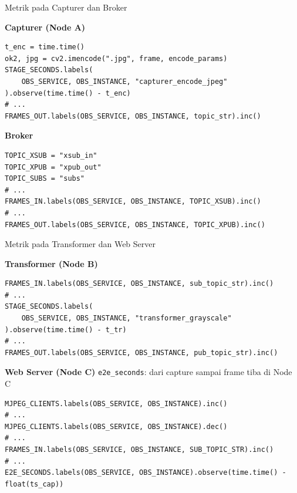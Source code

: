\documentclass[aspectratio=169, table]{beamer}
\begin{document}
\begin{frame}[fragile]{Metrik pada Capturer dan Broker}
	\vspace{20pt}
	
	\textbf{Capturer (Node A)}
	\begin{lstlisting}[style=PythonStyle,basicstyle=\ttfamily\scriptsize]
t_enc = time.time()
ok2, jpg = cv2.imencode(".jpg", frame, encode_params)
STAGE_SECONDS.labels(
    OBS_SERVICE, OBS_INSTANCE, "capturer_encode_jpeg"
).observe(time.time() - t_enc)
# ...
FRAMES_OUT.labels(OBS_SERVICE, OBS_INSTANCE, topic_str).inc()
\end{lstlisting}

	\textbf{Broker}
	\begin{lstlisting}[style=PythonStyle,basicstyle=\ttfamily\scriptsize]
TOPIC_XSUB = "xsub_in"
TOPIC_XPUB = "xpub_out"
TOPIC_SUBS = "subs"
# ...
FRAMES_IN.labels(OBS_SERVICE, OBS_INSTANCE, TOPIC_XSUB).inc()
# ...
FRAMES_OUT.labels(OBS_SERVICE, OBS_INSTANCE, TOPIC_XPUB).inc()
\end{lstlisting}
\end{frame}


\begin{frame}[fragile]{Metrik pada Transformer dan Web Server}
	\vspace{20pt}
	
	\textbf{Transformer (Node B)}
	\begin{lstlisting}[style=PythonStyle,basicstyle=\ttfamily\scriptsize]
FRAMES_IN.labels(OBS_SERVICE, OBS_INSTANCE, sub_topic_str).inc()
# ...
STAGE_SECONDS.labels(
    OBS_SERVICE, OBS_INSTANCE, "transformer_grayscale"
).observe(time.time() - t_tr)
# ...
FRAMES_OUT.labels(OBS_SERVICE, OBS_INSTANCE, pub_topic_str).inc()
\end{lstlisting}

	\textbf{Web Server (Node C)} {\footnotesize\texttt{e2e\_seconds}: dari capture sampai frame tiba di Node C}
	\begin{lstlisting}[style=PythonStyle,basicstyle=\ttfamily\scriptsize]
MJPEG_CLIENTS.labels(OBS_SERVICE, OBS_INSTANCE).inc()
# ...
MJPEG_CLIENTS.labels(OBS_SERVICE, OBS_INSTANCE).dec()
# ...
FRAMES_IN.labels(OBS_SERVICE, OBS_INSTANCE, SUB_TOPIC_STR).inc()
# ...
E2E_SECONDS.labels(OBS_SERVICE, OBS_INSTANCE).observe(time.time() - float(ts_cap))
\end{lstlisting}
\end{frame}
\end{document}
